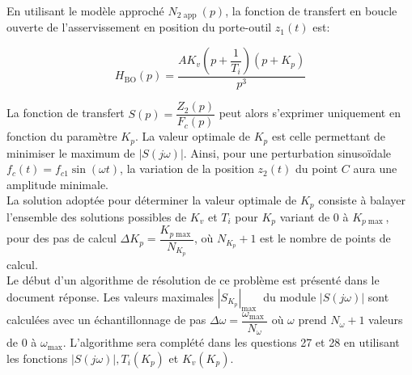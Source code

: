 En utilisant le modèle approché $N_{2 \text { app }}(p)$, la fonction de transfert en boucle ouverte de l'asservissement en position du porte-outil $z_{1}(t)$ est:

$$
H_{\mathrm{BO}}(p)=\dfrac{A K_{v}\left(p+\dfrac{1}{T_{i}}\right)\left(p+K_{p}\right)}{p^{3}}
$$



La fonction de transfert $S(p)=\dfrac{Z_{2}(p)}{F_{c}(p)}$ peut alors s'exprimer uniquement en fonction du paramètre $K_{p}$. La valeur optimale de $K_{p}$ est celle permettant de minimiser le maximum de $|S(j \omega)|$. Ainsi, pour une perturbation sinusoïdale $f_{c}(t)=f_{c 1} \sin (\omega t)$, la variation de la position $z_{2}(t)$ du point $C$ aura une amplitude minimale.\\
La solution adoptée pour déterminer la valeur optimale de $K_{p}$ consiste à balayer l'ensemble des solutions possibles de $K_{v}$ et $T_{i}$ pour $K_{p}$ variant de 0 à $K_{p \max }$, pour des pas de calcul $\Delta K_{p}=\dfrac{K_{p \max }}{N_{K_{p}}}$, où $N_{K_{p}}+1$ est le nombre de points de calcul.\\
Le début d'un algorithme de résolution de ce problème est présenté dans le document réponse. Les valeurs maximales $\left|S_{K_{p}}\right|_{\text {max }}$ du module $|S(j \omega)|$ sont calculées avec un échantillonnage de pas $\Delta \omega=\dfrac{\omega_{\text {max }}}{N_{\omega}}$ où $\omega$ prend $N_{\omega}+1$ valeurs de 0 à $\omega_{\max }$. L'algorithme sera complété dans les questions 27 et 28 en utilisant les fonctions $|S(j \omega)|, T_{i}\left(K_{p}\right)$ et $K_{v}\left(K_{p}\right)$.\\




